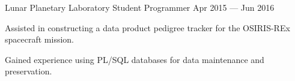 \begin{cventries}
{\begin{cvitems}
      \end{cvitems}
    }
  \cventry
    {Lunar Planetary Laboratory} %
    {Student Programmer} %
    {Apr 2015 --- Jun 2016} %
    {} %
    {
      \vspace{-0.15cm}
      \begin{cvitems} %
        \item Assisted in constructing a data product pedigree tracker for the OSIRIS-REx spacecraft mission.
        \item Gained experience using PL/SQL databases for data maintenance and preservation.
        \item <insert new text here>
      \end{cvitems}
    }
\end{cventries}
